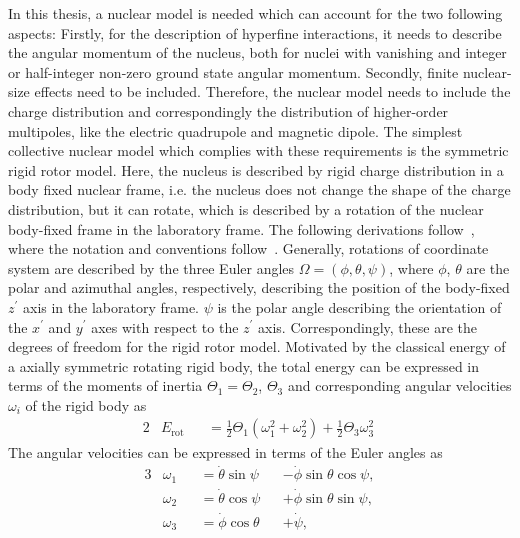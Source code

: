 In this thesis, a nuclear model is needed which can account for the two following aspects: Firstly, for the description of hyperfine interactions, it needs to describe the angular momentum of the nucleus, both for nuclei with vanishing and integer or half-integer non-zero ground state angular momentum. Secondly, finite nuclear-size effects need to be included. Therefore, the nuclear model needs to include the charge distribution and correspondingly the distribution of higher-order multipoles, like the electric quadrupole and magnetic dipole. The simplest collective nuclear model which complies with these requirements is the symmetric rigid rotor model. Here, the nucleus is described by rigid charge distribution in a body fixed nuclear frame, i.e. the nucleus does not change the shape of the charge distribution, but it can rotate, which is described by a rotation of the nuclear body-fixed frame in the laboratory frame. The following derivations follow~\cite{edmonds1960,brown_carrington,varshalovich1988}, where the notation and conventions follow~\cite{varshalovich1988}. Generally, rotations of coordinate system are described by the three Euler angles $\Omega=(\phi,\theta,\psi)$, where $\phi$, $\theta$ are the polar and azimuthal angles, respectively, describing the position of the body-fixed $z^{\prime}$ axis in the laboratory frame. $\psi$ is the polar angle describing the orientation of the $x^{\prime}$ and $y^{\prime}$ axes with respect to the $z^{\prime}$ axis. Correspondingly, these are the degrees of freedom for the rigid rotor model. Motivated by the classical energy of a axially symmetric rotating rigid body, the total energy can be expressed in terms of the moments of inertia ${\Theta_1}{=}{\Theta_2}$, $\Theta_3$ and corresponding angular velocities $\omega_i$ of the rigid body as
\begin{alignat}{2}
&E_{\text{rot}} &&= \frac{1}{2}\Theta_1 \left(\omega_1^2 +\omega_2^2\right)  + \frac{1}{2}\Theta_3 \omega_3 ^2\
\end{alignat}
The angular velocities can be expressed in terms of the Euler angles as
\begin{alignat}{3}
& \omega_1 &&=\dot{\theta}\sin\psi &&-\dot{\phi}\sin\theta\cos\psi,\\
& \omega_2 &&=\dot{\theta}\cos\psi &&+\dot{\phi}\sin\theta\sin\psi,\\
& \omega_3 &&=\dot{\phi}\cos\theta &&+ \dot{\psi},
\end{alignat}

